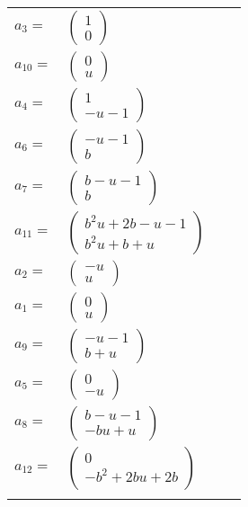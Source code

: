 \documentclass[1p]{elsarticle_modified}
\theoremstyle{definition}
\begin{document}
\begin{tabular}{m{7pt} m{180pt} m{7pt} m{180pt} }
\flushright $a_{3}=$&$\begin{pmatrix}1\\0\end{pmatrix}$ \\
\flushright $a_{10}=$&$\begin{pmatrix}0\\u\end{pmatrix}$ \\
\flushright $a_{4}=$&$\begin{pmatrix}1\\- u-1\end{pmatrix}$ \\
\flushright $a_{6}=$&$\begin{pmatrix}- u-1\\b\end{pmatrix}$ \\
\flushright $a_{7}=$&$\begin{pmatrix}b- u-1\\b\end{pmatrix}$ \\
\flushright $a_{11}=$&$\begin{pmatrix}b^2 u+2 b- u-1\\b^2 u+b+u\end{pmatrix}$ \\
\flushright $a_{2}=$&$\begin{pmatrix}- u\\u\end{pmatrix}$ \\
\flushright $a_{1}=$&$\begin{pmatrix}0\\u\end{pmatrix}$ \\
\flushright $a_{9}=$&$\begin{pmatrix}- u-1\\b+u\end{pmatrix}$ \\
\flushright $a_{5}=$&$\begin{pmatrix}0\\- u\end{pmatrix}$ \\
\flushright $a_{8}=$&$\begin{pmatrix}b- u-1\\- b u+u\end{pmatrix}$ \\
\flushright $a_{12}=$&$\begin{pmatrix}0\\- b^2+2 b u+2 b\end{pmatrix}$\\&\end{tabular}
\end{document}
